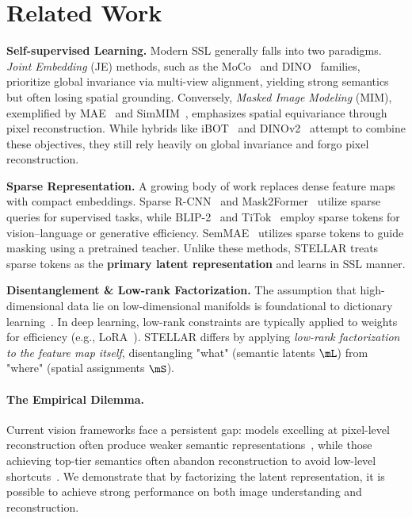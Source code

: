 \section{Related Work}

\textbf{Self-supervised Learning.} Modern SSL generally falls into two paradigms. \textit{Joint Embedding} (JE) methods, such as the MoCo~\citep{he2020momentum} and DINO~\citep{oquab2023dinov2} families, prioritize global invariance via multi-view alignment, yielding strong semantics but often losing spatial grounding. Conversely, \textit{Masked Image Modeling} (MIM), exemplified by MAE~\citep{he2022masked} and SimMIM~\citep{xie2022simmim}, emphasizes spatial equivariance through pixel reconstruction. While hybrids like iBOT~\citep{zhou2021ibot} and DINOv2~\citep{oquab2023dinov2} attempt to combine these objectives, they still rely heavily on global invariance and forgo pixel reconstruction. 

\textbf{Sparse Representation.} A growing body of work replaces dense feature maps with compact embeddings. Sparse R-CNN~\citep{sun2021sparse} and Mask2Former~\citep{cheng2022masked} utilize sparse queries for supervised tasks, while BLIP-2~\citep{li2023blip} and TiTok~\citep{yu2024image} employ sparse tokens for vision--language or generative efficiency. SemMAE~\citep{li2022semmae} utilizes sparse tokens to guide masking using a pretrained teacher. Unlike these methods, STELLAR treats sparse tokens as the \textbf{primary latent representation} and learns in SSL manner.

\textbf{Disentanglement \& Low-rank Factorization.} The assumption that high-dimensional data lie on low-dimensional manifolds is foundational to dictionary learning~\citep{mairal2008supervised}. In deep learning, low-rank constraints are typically applied to weights for efficiency (e.g., LoRA~\citep{hu2022lora}). STELLAR differs by applying \textit{low-rank factorization to the feature map itself}, disentangling "what" (semantic latents $\mL$) from "where" (spatial assignments $\mS$).



\paragraph{The Empirical Dilemma.} Current vision frameworks face a persistent gap: models excelling at pixel-level reconstruction often produce weaker semantic representations~\citep{zhang2022improving, chen2024deconstructing}, while those achieving top-tier semantics often abandon reconstruction to avoid low-level shortcuts~\citep{assran2023self, darcet2025cluster}. We demonstrate that by factorizing the latent representation, it is possible to achieve strong performance on both image understanding and reconstruction.


